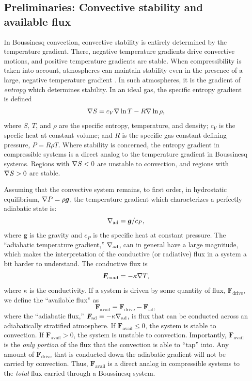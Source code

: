\subsection{Preliminaries: Convective stability and available flux}
\label{sec:stability}
In Boussinesq convection, convective stability is entirely determined by the temperature gradient.
There, negative temperature gradients drive convective motions, and positive temperature gradients are stable.
When compressibility is taken into account, atmospheres can maintain stability even in the presence of a large, negative temperature gradient \citep{spiegel&veronis1960}.
In such atmospheres, it is the gradient of \emph{entropy} which determines stability.
In an ideal gas, the specific entropy gradient is defined
\begin{equation}
\nabla S = c_V \nabla\ln T - R \nabla\ln\rho,
\end{equation}
where $S$, $T$, and $\rho$ are the specific entropy, temperature, and density; $c_V$ is the specfic heat at constant volume; and $R$ is the specific gas constant defining pressure, $P = R \rho T$.
Where stability is concerned, the entropy gradient in compressible systems is a direct analog to the temperature gradient in Boussinesq systems.
Regions with $\nabla S < 0$ are unstable to convection, and regions with $\nabla S > 0$ are stable.

Assuming that the convective system remains, to first order, in hydrostatic equilibrium, $\nabla P = \rho \bm{g}$, the temperature gradient which characterizes a perfectly adiabatic state is:
\begin{equation}
\nabla_{\text{ad}} = \bm{g}/c_P,
\end{equation}
where $\bm{g}$ is the gravity and $c_P$ is the specific heat at constant pressure.
The ``adiabatic temperature gradient,'' $\nabla_{\text{ad}}$, can in general have a large magnitude, which makes the interpretation of the conductive (or radiative) flux in a system a bit harder to understand.
The conductive flux is
\begin{equation}
\bm{F}_{\text{cond}} = -\kappa \nabla T,
\end{equation}
where $\kappa$ is the conductivity.
If a system is driven by some quantity of flux, $\bm{F}_{\text{drive}}$, we define the ``available flux'' as
\begin{equation}
\bm{F}_{\text{avail}} \equiv \bm{F}_{\text{drive}} - \bm{F}_{\text{ad}},
\end{equation}
where the ``adiabatic flux,'' $\bm{F}_{\text{ad}} = -\kappa\nabla_{\text{ad}}$, is flux that can be conducted across an adiabatically stratified atmosphere.
If $\bm{F}_{\text{avail}} \leq 0$, the system is stable to convection.
If $\bm{F}_{\text{avail}} > 0$, the system is unstable to convection.
Importantly, $\bm{F}_{\text{avail}}$ is the \emph{only portion} of the flux that the convection is able to ``tap'' into.
Any amount of $\bm{F}_{\text{drive}}$ that is conducted down the adiabatic gradient will not be carried by convection.
Thus, $\bm{F}_{\text{avail}}$ is a direct analog in compressible systems to the \emph{total} flux carried through a Boussinesq system.

